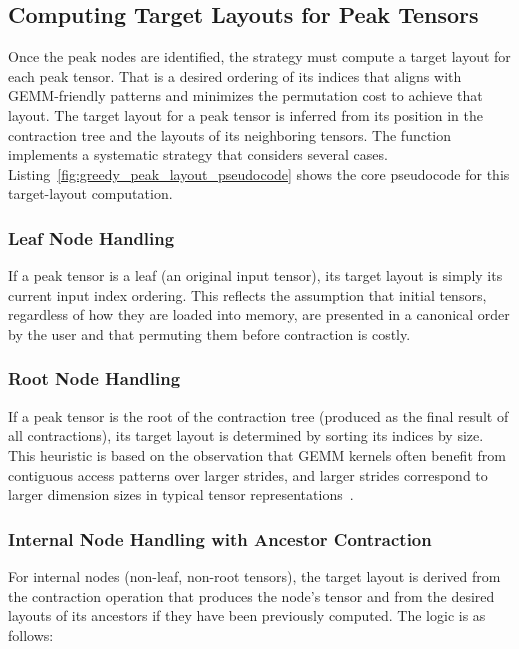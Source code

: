\subsection{Computing Target Layouts for Peak Tensors}

Once the peak nodes are identified, the strategy must compute a target layout for each peak tensor. That is a desired ordering of its indices that aligns with \ac{GEMM}-friendly patterns and minimizes the permutation cost to achieve that layout. The target layout for a peak tensor is inferred from its position in the contraction tree and the layouts of its neighboring tensors. The function implements a systematic strategy that considers several cases. Listing~\ref{fig:greedy_peak_layout_pseudocode} shows the core pseudocode for this target-layout computation.

\subsubsection{Leaf Node Handling}

If a peak tensor is a leaf (an original input tensor), its target layout is simply its current input index ordering. This reflects the assumption that initial tensors, regardless of how they are loaded into memory, are presented in a canonical order by the user and that permuting them before contraction is costly.

\subsubsection{Root Node Handling}

If a peak tensor is the root of the contraction tree (produced as the final result of all contractions), its target layout is determined by sorting its indices by size. This heuristic is based on the observation that \ac{GEMM} kernels often benefit from contiguous access patterns over larger strides, and larger strides correspond to larger dimension sizes in typical tensor representations~\cite{blom2025multi}.

\subsubsection{Internal Node Handling with Ancestor Contraction}

For internal nodes (non-leaf, non-root tensors), the target layout is derived from the contraction operation that produces the node's tensor and from the desired layouts of its ancestors if they have been previously computed. The logic is as follows:

